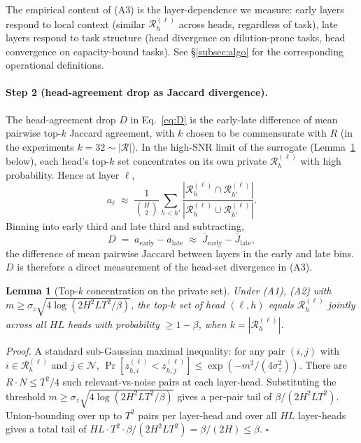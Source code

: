 \documentclass{article} %
\newtheorem{lemma}{Lemma}
\begin{document}
The empirical content of (A3) is the layer-dependence we measure: early
layers respond to local context (similar $\mathcal{R}^{(\ell)}_h$ across
heads, regardless of task), late layers respond to task structure (head
divergence on dilution-prone tasks, head convergence on capacity-bound
tasks). See \S\ref{subsec:algo} for the corresponding operational
definitions.

\paragraph{Step 2 (head-agreement drop as Jaccard divergence).}
The head-agreement drop $D$ in Eq.~\eqref{eq:D} is the early-late
difference of mean pairwise top-$k$ Jaccard agreement, with $k$ chosen
to be commensurate with $R$ (in the experiments $k = 32 \sim |\mathcal{R}|$).
In the high-SNR limit of the surrogate (Lemma~\ref{lem:topk} below),
each head's top-$k$ set concentrates on its own private
$\mathcal{R}^{(\ell)}_h$ with high probability. Hence at layer $\ell$,
\begin{equation}
a_\ell \;\approx\; \frac{1}{\binom{H}{2}} \sum_{h < h'}
\frac{|\mathcal{R}^{(\ell)}_h \cap \mathcal{R}^{(\ell)}_{h'}|}
{|\mathcal{R}^{(\ell)}_h \cup \mathcal{R}^{(\ell)}_{h'}|}.
\end{equation}
Binning into early third and late third and subtracting,
\begin{equation}
\label{eq:D-jaccard}
D \;=\; a_{\text{early}} - a_{\text{late}}
\;\approx\;
\overline{J}_{\text{early}} - \overline{J}_{\text{late}},
\end{equation}
the difference of mean pairwise Jaccard between layers in the early and
late bins. $D$ is therefore a direct measurement of the head-set
divergence in (A3).

\begin{lemma}[Top-$k$ concentration on the private set]
\label{lem:topk}
Under (A1), (A2) with $m \geq \sigma_z \sqrt{4 \log(2 H^2 L T^2 / \beta)}$,
the top-$k$ set of head $(\ell, h)$ equals $\mathcal{R}^{(\ell)}_h$
jointly across all $HL$ heads with probability $\geq 1 - \beta$, when
$k = |\mathcal{R}^{(\ell)}_h|$.
\end{lemma}

\emph{Proof.} A standard sub-Gaussian maximal inequality: for any pair
$(i, j)$ with $i \in \mathcal{R}^{(\ell)}_h$ and $j \in \mathcal{N}$,
$\Pr[z_{h, i}^{(\ell)} < z_{h, j}^{(\ell)}] \leq \exp(-m^2 /
(4 \sigma_z^2))$. There are $R \cdot N \leq T^2 / 4$ such relevant-vs-noise
pairs at each layer-head. Substituting the threshold $m \geq
\sigma_z \sqrt{4 \log(2 H^2 L T^2 / \beta)}$ gives a per-pair tail of
$\beta / (2 H^2 L T^2)$. Union-bounding over up to $T^2$ pairs per
layer-head and over all $HL$ layer-heads gives a total tail of $HL \cdot
T^2 \cdot \beta / (2 H^2 L T^2) = \beta / (2 H) \leq \beta$.
\hfill $\square$
\end{document}
